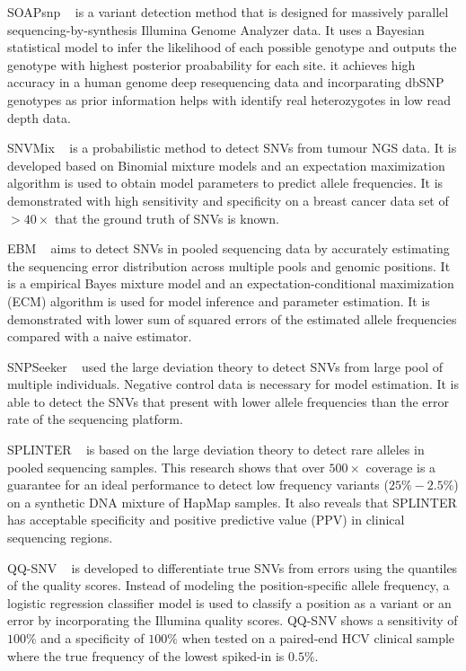 \documentclass[11pt,reqno]{amsart}
\begin{document}
SOAPsnp ~\citep{Li2009} is a variant detection method that is designed for massively parallel sequencing-by-synthesis Illumina Genome Analyzer data.
It uses a Bayesian statistical model to infer the likelihood of each possible genotype and outputs the genotype with highest posterior proabability for each site.
it achieves high accuracy in a human genome deep resequencing data and incorparating dbSNP genotypes as prior information helps with identify real heterozygotes in low read depth data.

SNVMix ~\citep{Goya2010} is a probabilistic method to detect SNVs from tumour NGS data.
It is developed based on Binomial mixture models and an expectation maximization algorithm is used to obtain model parameters to predict allele frequencies.
It is demonstrated with high sensitivity and specificity on a breast cancer data set of $> 40 \times$ that the ground truth of SNVs is known.

EBM ~\citep{Zhou2012} aims to detect SNVs in pooled sequencing data by accurately estimating the sequencing error distribution across multiple pools and genomic positions. 
It is a empirical Bayes mixture model and an expectation-conditional maximization (ECM) algorithm is used for model inference and parameter estimation.
It is demonstrated with lower sum of squared errors of the estimated allele frequencies compared with a naive estimator.

SNPSeeker ~\citep{Druley2009} used the large deviation theory to detect SNVs from large pool of multiple individuals.
Negative control data is necessary for model estimation.
It is able to detect the SNVs that present with lower allele frequencies than the error rate of the sequencing platform.

SPLINTER ~\citep{Spencer2014} is based on the large deviation theory to detect rare alleles in pooled sequencing samples.
This research shows that over $500 \times$ coverage is a guarantee for an ideal performance to detect low frequency variants ($25\% - 2.5\%$) on a synthetic DNA mixture of HapMap samples.
It also reveals that SPLINTER has acceptable specificity and positive predictive value (PPV) in clinical sequencing regions.

QQ-SNV ~\citep{VanderBorght2015} is developed to differentiate true SNVs from errors using the quantiles of the quality scores.
Instead of modeling the position-specific allele frequency, a logistic regression classifier model is used to classify a position as a variant or an error by incorporating the Illumina quality scores.
QQ-SNV shows a sensitivity of $100\%$ and a specificity of $100\%$ when tested on a paired-end HCV clinical sample where the true frequency of the lowest spiked-in is $0.5\%$.
\end{document}
